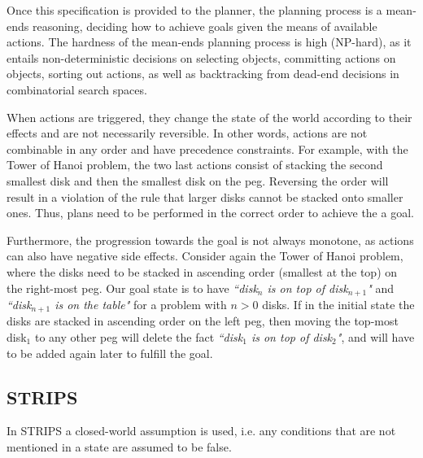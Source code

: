 Once this specification is provided to the planner, the planning process is a mean-ends reasoning, deciding how to achieve goals given the means of available actions. The hardness of the mean-ends planning process is high (NP-hard), as it entails non-deterministic decisions on selecting objects, committing actions on objects, sorting out actions, as well as backtracking from dead-end decisions in combinatorial search spaces.

When actions are triggered, they change the state of the world according to their effects and are not necessarily reversible. In other words, actions are not combinable in any order and have precedence constraints. For example, with the Tower of Hanoi problem, the two last actions consist of stacking the second smallest disk and then the smallest disk on the peg. Reversing the order will result in a violation of the rule that larger disks cannot be stacked onto smaller ones. Thus, plans need to be performed in the correct order to achieve the a goal.

Furthermore, the progression towards the goal is not always monotone, as actions can also have negative side effects. Consider again the Tower of Hanoi problem, where the disks need to be stacked in ascending order (smallest at the top) on the right-most peg. Our goal state is to have \textit{``disk$_{n}$ is on top of disk$_{n+1}$"} and \textit{``disk$_{n+1}$ is on the table"} for a problem with $n>0$ disks. If in the initial state the disks are stacked in ascending order on the left peg, then moving the top-most disk$_1$ to any other peg will delete the fact \textit{``disk$_1$ is on top of disk$_2$"}, and will have to be added again later to fulfill the goal.


\subsection{STRIPS}\label{subsec:STRIPS}
In STRIPS a closed-world assumption is used, i.e. any conditions that are not mentioned in a state are assumed to be false.

